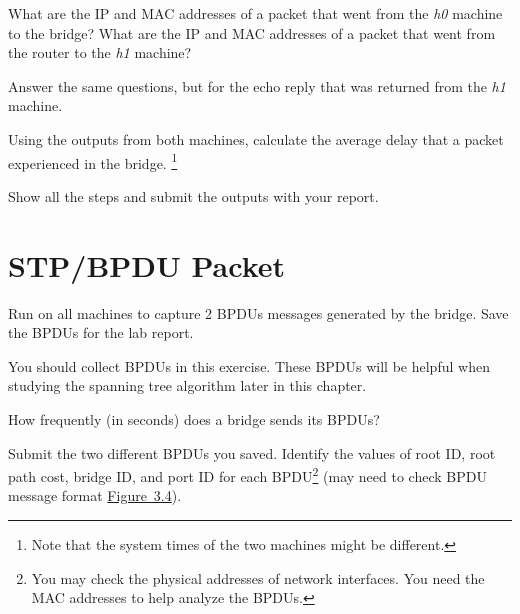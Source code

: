 \documentclass{../UTNetLab}
\begin{document}
    \begin{report}
        \item What are the IP and MAC addresses of a packet that went from the \textit{h0} machine to the bridge?
            What are the IP and MAC addresses of a packet that went from the router to the \textit{h1} machine?

        \item Answer the same questions, but for the echo reply that was returned from the \textit{h1} machine.

        \item Using the  outputs from both machines, calculate the average delay that a packet experienced in the bridge.
            \footnote{Note that the system times of the two machines might be different.}
    \end{report}

    Show all the steps and submit the  outputs with your report.

\section{STP/BPDU Packet}
    Run  on all machines to capture 2 BPDUs messages generated by the bridge.
    Save the BPDUs for the lab report.



    You should collect BPDUs in this exercise.
    These BPDUs will be helpful when studying the spanning tree algorithm later in this chapter.

    \begin{report}
        \item How frequently (in seconds) does a bridge sends its BPDUs?

        \item Submit the two different BPDUs you saved.
            Identify the values of root ID, root path cost, bridge ID, and port ID for each BPDU\footnote{You may check the physical addresses of network interfaces.
            You need the MAC addresses to help analyze the BPDUs.} (may need to check BPDU message format \hyperref[fig:3.4]{Figure~3.4}).
    \end{report}
\end{document}
